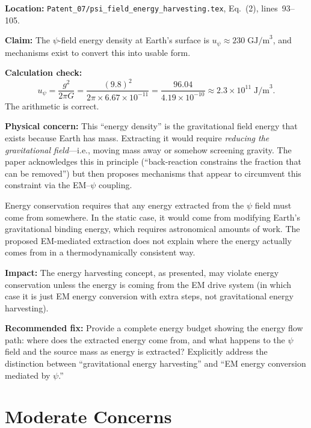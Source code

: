 \documentclass[12pt,a4paper]{article}
\begin{document}
\begin{serious}
\textbf{Location:} \texttt{Patent\_07/psi\_field\_energy\_harvesting.tex},
Eq.~(2), lines~93--105.

\medskip
\textbf{Claim:} The $\psi$-field energy density at Earth's surface is
$u_\psi \approx 230\;\text{GJ/m}^3$, and mechanisms exist to convert
this into usable form.

\medskip
\textbf{Calculation check:}
\[
u_\psi = \frac{g^2}{2\pi G} = \frac{(9.8)^2}{2\pi \times 6.67\times 10^{-11}}
= \frac{96.04}{4.19\times 10^{-10}} \approx 2.3\times 10^{11}\;\text{J/m}^3.
\]
The arithmetic is correct.

\medskip
\textbf{Physical concern:} This ``energy density'' is the gravitational
field energy that exists because Earth has mass. Extracting it would require
\textit{reducing the gravitational field}---i.e., moving mass away or somehow
screening gravity. The paper acknowledges this in principle (``back-reaction
constrains the fraction that can be removed'') but then proposes mechanisms
that appear to circumvent this constraint via the EM--$\psi$ coupling.

Energy conservation requires that any energy extracted from the $\psi$ field
must come from somewhere. In the static case, it would come from modifying
Earth's gravitational binding energy, which requires astronomical amounts of
work. The proposed EM-mediated extraction does not explain where the energy
actually comes from in a thermodynamically consistent way.

\medskip
\textbf{Impact:} The energy harvesting concept, as presented, may violate
energy conservation unless the energy is coming from the EM drive system
(in which case it is just EM energy conversion with extra steps, not
gravitational energy harvesting).

\medskip
\textbf{Recommended fix:} Provide a complete energy budget showing the
energy flow path: where does the extracted energy come from, and what
happens to the $\psi$ field and the source mass as energy is extracted?
Explicitly address the distinction between ``gravitational energy
harvesting'' and ``EM energy conversion mediated by $\psi$.''
\end{serious}

\section{Moderate Concerns}
\label{sec:moderate}
\end{document}
